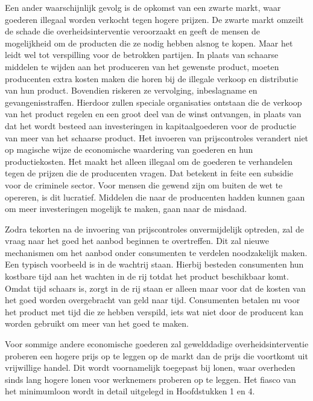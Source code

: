 \documentclass[
  a5paper,
  smalldemyvopaper,11pt,twoside,onecolumn,openright,extrafontsizes,
hidelinks]{memoir}
\begin{document}
Een ander waarschijnlijk gevolg is de opkomst van een zwarte markt, waar
goederen illegaal worden verkocht tegen hogere prijzen. De zwarte markt
omzeilt de schade die overheidsinterventie veroorzaakt en geeft de
mensen de mogelijkheid om de producten die ze nodig hebben alsnog te
kopen. Maar het leidt wel tot verspilling voor de betrokken partijen. In
plaats van schaarse middelen te wijden aan het produceren van het
gewenste product, moeten producenten extra kosten maken die horen bij de
illegale verkoop en distributie van hun product. Bovendien riskeren ze
vervolging, inbeslagname en gevangenisstraffen. Hierdoor zullen speciale
organisaties ontstaan die de verkoop van het product regelen en een
groot deel van de winst ontvangen, in plaats van dat het wordt besteed
aan investeringen in kapitaalgoederen voor de productie van meer van het
schaarse product. Het invoeren van prijscontroles verandert niet op
magische wijze de economische waardering van goederen en hun
productiekosten. Het maakt het alleen illegaal om de goederen te
verhandelen tegen de prijzen die de producenten vragen. Dat betekent in
feite een subsidie voor de criminele sector. Voor mensen die gewend zijn
om buiten de wet te opereren, is dit lucratief. Middelen die naar de
producenten hadden kunnen gaan om meer investeringen mogelijk te maken,
gaan naar de misdaad.

Zodra tekorten na de invoering van prijscontroles onvermijdelijk
optreden, zal de vraag naar het goed het aanbod beginnen te overtreffen.
Dit zal nieuwe mechanismen om het aanbod onder consumenten te verdelen
noodzakelijk maken. Een typisch voorbeeld is in de wachtrij staan.
Hierbij besteden consumenten hun kostbare tijd aan het wachten in de rij
totdat het product beschikbaar komt. Omdat tijd schaars is, zorgt in de
rij staan er alleen maar voor dat de kosten van het goed worden
overgebracht van geld naar tijd. Consumenten betalen nu voor het product
met tijd die ze hebben verspild, iets wat niet door de producent kan
worden gebruikt om meer van het goed te maken.

Voor sommige andere economische goederen zal gewelddadige
overheidsinterventie proberen een hogere prijs op te leggen op de markt
dan de prijs die voortkomt uit vrijwillige handel. Dit wordt
voornamelijk toegepast bij lonen, waar overheden sinds lang hogere lonen
voor werknemers proberen op te leggen. Het fiasco van het minimumloon
wordt in detail uitgelegd in Hoofdstukken 1 en 4.
\end{document}
